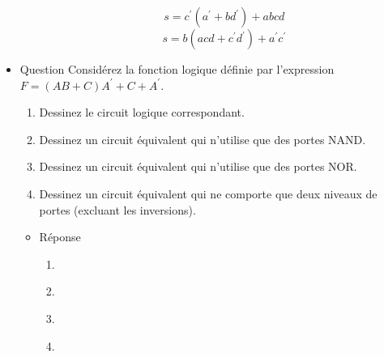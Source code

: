 \documentclass[letter, oneside]{book}
\begin{document}
\begin{itemize}
\begin{itemize}
\begin{center}

\end{center}

$$
  s = c^{\prime}(a^{\prime}+bd^{\prime}) + abcd 
$$
$$
  s = b ( acd + c^{\prime}d^{\prime}) + a^{\prime} c^{\prime}
$$
\end{itemize}

\item Question
\label{sec:org0db45ef}
Considérez la fonction logique définie par l'expression \(F = (AB + C)
A^{\prime} + C + A^{\prime}\).

\begin{enumerate}
\item Dessinez le circuit logique correspondant.

\item Dessinez un circuit équivalent qui n'utilise que des portes
NAND.

\item Dessinez un circuit équivalent qui n'utilise que des portes
NOR.

\item Dessinez un circuit équivalent qui ne comporte que deux niveaux de
portes (excluant les inversions).
\end{enumerate}

\begin{itemize}
\item Réponse
\label{sec:org51d3fd1}
\begin{enumerate}
\item \begin{center}

\end{center}

\item \begin{center}

\end{center}

\item \begin{center}

\end{center}

\item \begin{center}

\end{center}
\end{enumerate}
\end{itemize}


\end{itemize}
\end{document}
